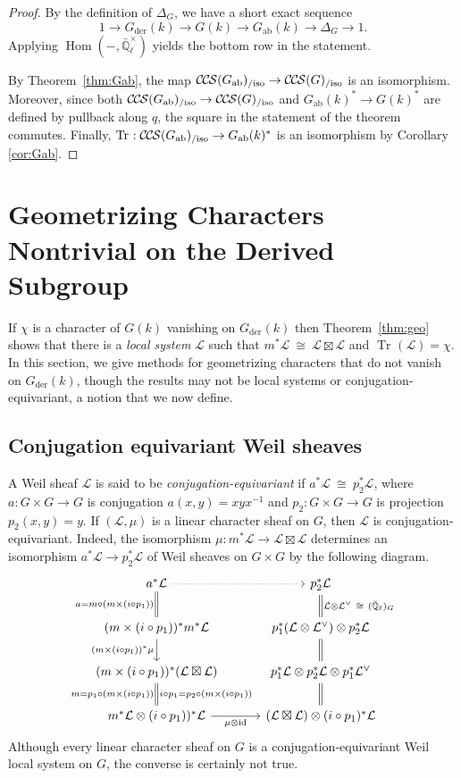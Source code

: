 \documentclass[10pt]{amsart}
\theoremstyle{plain}
\theoremstyle{definition}
\newcommand{\EE}{\mathbb{\bar Q}_\ell}
\newcommand{\EEx}{\EE^\times}
\DeclareMathOperator{\Hom}{Hom}
\DeclareMathOperator{\id}{id}
\newcommand{\der}{_{\operatorname{der}}}
\newcommand{\ab}{_{\operatorname{ab}}}
\newcommand{\iso}{{\ \cong\ }}
\DeclareMathOperator{\Tr}{Tr}
\newcommand{\TrFrob}[1]{\Tr_{#1}}
\newcommand{\cs}[1]{{\mathcal{#1}}}
\newcommand{\CCS}{{\mathcal{C\hskip-.8pt C\hskip-0.8pt S}}}
\newcommand{\CCSiso}[1]{\CCS(#1)_{/\text{iso}}}
\begin{document}
\begin{proof}
By the definition of $\Delta_G$, we have a short exact sequence
\[
1 \to G\der(k) \to G(k) \to G\ab(k) \to \Delta_G \to 1.
\]
Applying $\Hom(-, \EEx)$ yields the bottom row in the statement.

By Theorem~\ref{thm:Gab}, the map $\CCSiso{G\ab} \to \CCSiso{G}$ is an isomorphism.
Moreover, since both $\CCSiso{G\ab} \to \CCSiso{G}$ and $G\ab(k)^* \to G(k)^*$ are
defined by pullback along $q$, the square in the statement of the theorem commutes.
Finally, $\TrFrob{} : \CCSiso{G\ab} \to G\ab(k)^*$ is an isomorphism by Corollary \ref{cor:Gab}.
\end{proof}

\section{Geometrizing Characters Nontrivial on the Derived Subgroup} \label{sec:badchar}

If $\chi$ is a character of $G(k)$ vanishing on $G\der(k)$ then Theorem~\ref{thm:geo} shows that there is a \emph{local system} $\cs{L}$ such that $m^*\cs{L} \iso \cs{L}\boxtimes\cs{L}$ and $\TrFrob{}(\cs{L}) = \chi$.
In this section, we give methods for geometrizing characters that do not vanish on $G\der(k)$, though the results may not be local systems or conjugation-equivariant, a notion that we now define.

\subsection{Conjugation equivariant Weil sheaves}\label{ssec:equivariant}

A Weil sheaf $\cs{L}$ is said to be \emph{conjugation-equivariant} if $a^*\cs{L} \iso p_2^*\cs{L}$, where  $a : G\times G\to G$ is conjugation $a(x,y)=xyx^{-1}$ and $p_2: G\times G\to G$ is projection $p_2(x,y)=y$. 
If $(\cs{L},\mu)$ is a linear character sheaf on $G$, then $\cs{L}$ is conjugation-equivariant. Indeed,
the isomorphism $\mu : m^*\cs{L} \to \cs{L}\boxtimes\cs{L}$ determines an isomorphism $a^*\cs{L} \to p_2^*\cs{L}$ of Weil sheaves on $G\times G$ by the following diagram.
\[
\begin{tikzcd}[column sep = 30]
a^*\cs{L} \arrow[equal]{d}[swap]{a= m\circ (m\times (i\circ p_1))} \arrow[dotted]{r} & p_2^*\cs{L}  \\
(m\times (i\circ p_1))^* m^*\cs{L} \arrow{d}[swap]{(m\times (i\circ p_1))^*\mu}  & p_1^*(\cs{L} \otimes \cs{L}^\vee) \otimes p_2^*\cs{L} \arrow[equal]{u}[swap]{\cs{L}\otimes \cs{L}^\vee \iso (\EE)_{G}} \\
(m\times (i\circ p_1))^* ( \cs{L}\boxtimes\cs{L}) \arrow[equal]{d}{i\circ p_1 = p_2\circ(m\times(i\circ p_1))}[swap]{m= p_1\circ(m\times(i\circ p_1))}  & p_1^*\cs{L} \otimes p_2^*\cs{L} \otimes p_1^*\cs{L}^\vee \arrow[equal]{u} \\
m^*\cs{L}\otimes (i\circ p_1))^*\cs{L} \arrow{r}[swap]{\mu \otimes \id} & (\cs{L}\boxtimes\cs{L})\otimes (i\circ p_1)^*\cs{L} \arrow[equal]{u}
\end{tikzcd}
\]
Although every linear character sheaf on $G$ is a conjugation-equivariant Weil local system on $G$, the converse is certainly not true. 
\end{document}
